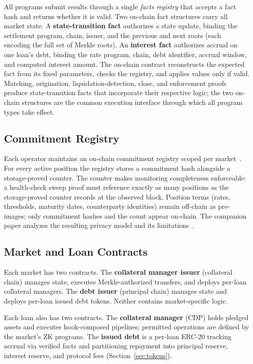 All programs submit results through a single \emph{facts registry} that accepts a fact hash and returns whether it is valid. Two on-chain fact structures carry all market state. A \textbf{state-transition fact} authorizes a state update, binding the settlement program, chain, issuer, and the previous and next roots (each encoding the full set of Merkle roots). An \textbf{interest fact} authorizes accrual on one loan's debt, binding the rate program, chain, debt identifier, accrual window, and computed interest amount. The on-chain contract reconstructs the expected fact from its fixed parameters, checks the registry, and applies values only if valid. Matching, origination, liquidation-detection, close, and enforcement proofs produce state-transition facts that incorporate their respective logic; the two on-chain structures are the common execution interface through which all program types take effect.

\subsection{Commitment Registry}

Each operator maintains an on-chain commitment registry scoped per market~\cite{daloc-decent2026}. For every active position the registry stores a commitment hash alongside a storage-proved counter. The counter makes monitoring completeness enforceable: a health-check sweep proof must reference exactly as many positions as the storage-proved counter records at the observed block. Position terms (rates, thresholds, maturity dates, counterparty identities) remain off-chain as pre-images; only commitment hashes and the count appear on-chain. The companion paper analyzes the resulting privacy model and its limitations~\cite{daloc-decent2026}.

\subsection{Market and Loan Contracts}

Each market has two contracts. The \textbf{collateral manager issuer} (collateral chain) manages state, executes Merkle-authorized transfers, and deploys per-loan collateral managers. The \textbf{debt issuer} (principal chain) manages state and deploys per-loan issued debt tokens. Neither contains market-specific logic.

Each loan also has two contracts. The \textbf{collateral manager} (CDP) holds pledged assets and executes hook-composed pipelines; permitted operations are defined by the market's ZK programs. The \textbf{issued debt} is a per-loan ERC-20 tracking accrual via verified facts and partitioning repayment into principal reserve, interest reserve, and protocol fees (Section~\ref{sec:tokens}).

